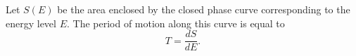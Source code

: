 Let $S(E)$ be the area enclosed by the closed phase curve corresponding to the energy level $E$.
The period of motion along this curve is equal to
$$T = \frac{dS}{dE}.$$
